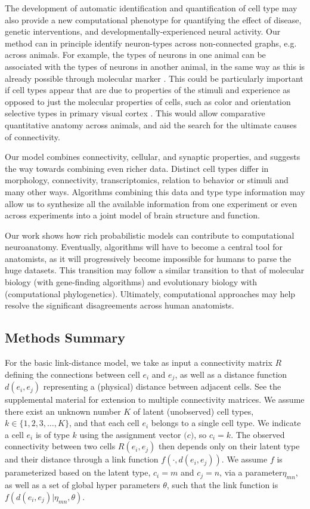 \documentclass{article}
\renewcommand{\vec}[1]{\mathbf{#1}}
\begin{document}
The development of automatic identification and quantification of cell
type may also provide a new computational phenotype for quantifying
the effect of disease, genetic interventions, and
developmentally-experienced neural activity. Our method can in
principle identify neuron-types across non-connected graphs,
e.g. across animals. For example, the types of neurons in one animal
can be associated with the types of neurons in another animal, in the
same way as this is already possible through molecular marker
\autocite{Brown2009}. This could be particularly important if cell
types appear that are due to properties of the stimuli and experience
as opposed to just the molecular properties of cells, such as color
and orientation selective types in primary visual cortex
\autocite{Sincich2005,Lennie2005}. This would allow comparative
quantitative anatomy across animals, and aid the search for the
ultimate causes of connectivity.

Our model combines connectivity, cellular, and synaptic properties,
and suggests the way towards combining even richer data. Distinct cell
types differ in morphology, connectivity, transcriptomics, relation to
behavior or stimuli and many other ways. Algorithms combining this
data and type type information may allow us to synthesize all the
available information from one experiment or even across experiments
into a joint model of brain structure and function.

Our work shows how rich probabilistic models can contribute to computational neuroanatomy. 
Eventually, algorithms will have to become a central tool for
anatomists, as it will progressively become impossible for humans to
parse the huge datasets. This transition may follow a similar
transition to that of molecular biology (with gene-finding
algorithms) and evolutionary biology with (computational
phylogenetics). Ultimately, computational approaches may help resolve the significant
disagreements across human anatomists. 


\subsection*{Methods Summary}

For the basic link-distance model, we take as input a connectivity
matrix $R$ defining the connections between cell $e_i$ and $e_j$, as
well as a distance function $d(e_i, e_j)$ representing a (physical)
distance between adjacent cells.  See
the supplemental material for extension to multiple connectivity
matrices. We assume there exist an unknown number $K$ of latent
(unobserved) cell types, $k \in \{1, 2, 3, \dots, K\}$, and that each
cell $e_i$ belongs to a single cell type. We indicate a cell $e_i$ is
of type $k$ using the assignment vector $\vec(c)$, so $c_i = k$. The
observed connectivity between two cells $R(e_i, e_j)$ then depends
only on their latent type and their distance through a link function
$f(\cdot, d(e_i, e_j))$. We assume $f$ is parameterized based on the
latent type, $c_i=m$ and $c_j=n$, via a parameter$\eta_{mn}$, as well
as a set of global hyper parameters $\theta$, such that the link
function is $f(d(e_i, e_j) | \eta_{mn}, \theta)$.
\end{document}
